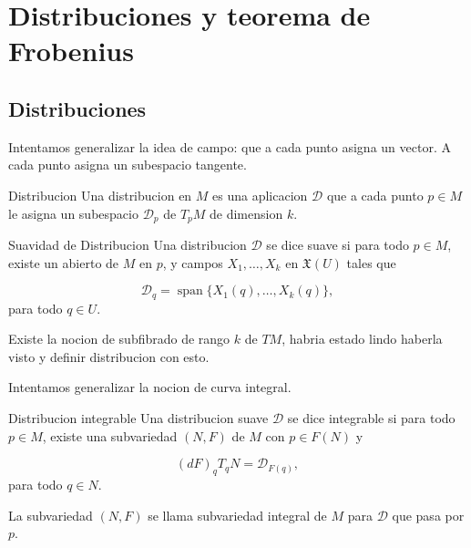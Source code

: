 \chapter{Distribuciones y teorema de Frobenius}
\label{ch:teo-23}
\section{Distribuciones}
\begin{bookremark}{}
Intentamos generalizar la idea de campo: que a cada punto asigna un vector. A cada punto asigna un subespacio tangente.

\end{bookremark}
\begin{bookdefinition}{Distribucion}
Una distribucion en $M$ es una aplicacion $\mathcal D$ que a cada punto $p\in M$ le asigna un subespacio $\mathcal D_p$ de $T_pM$ de dimension $k$.

\end{bookdefinition}
\begin{bookdefinition}{Suavidad de Distribucion}
Una distribucion $\mathcal D$ se dice suave si para todo $p\in M$, existe un abierto de $M$ en $p$, y campos $X_1,\ldots,X_k$ en $\mathfrak X(U)$ tales que

\[
\mathcal D_q=\operatorname{span}\{X_1(q),\ldots,X_k(q)\},
\]
para todo $q\in U$.

\end{bookdefinition}
\begin{bookremark}{}
Existe la nocion de subfibrado de rango $k$ de $TM$, habria estado lindo haberla visto y definir distribucion con esto.

\end{bookremark}
\begin{bookremark}{}
Intentamos generalizar la nocion de curva integral.

\end{bookremark}
\begin{bookdefinition}{Distribucion integrable}
Una distribucion suave $\mathcal D$ se dice integrable si para todo $p\in M$, existe una subvariedad $(N,F)$ de $M$ con $p\in F(N)$ y

\[
(dF)_qT_qN=\mathcal D_{F(q)},
\]
para todo $q\in N$.

La subvariedad $(N,F)$ se llama subvariedad integral de $M$ para $\mathcal D$ que pasa por $p$.

\end{bookdefinition}
